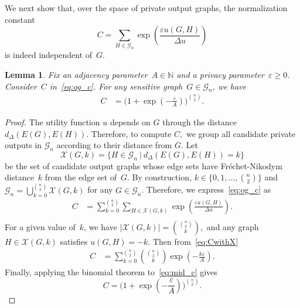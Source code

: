 \documentclass[conference]{ieeeconf}
\newtheorem{lemma}{Lemma}
\newcommand{\FN}{Fr\'echet-Nikodym }
\newcommand{\G}{\mathcal{G}}
\newcommand{\uti}{d_\Delta}
\begin{document}
We next show that, over the space of private output graphs,
the normalization constant 
\begin{equation}\label{eq:og_c}
C=\sum_{H\in\mathcal{G}_n}\exp\left(\frac{\varepsilon u(G,H)}{\Delta u}\right)
\end{equation}
is indeed
independent of~$G$.

\begin{lemma}\label{lem:norm_const}
Fix an adjacency parameter~$A \in \mathbb{N}$
and a privacy parameter~$\varepsilon \geq 0$.
Consider~$C$ in~\eqref{eq:og_c}. 
For any sensitive graph~$G\in\mathcal{G}_n$, we have 
\begin{equation}
\begin{aligned}\label{eq:big_C}
    C &= \biggl(1+\exp\left(-\frac{\varepsilon}{A}\right) \biggr)^{\binom{n}{2}}.
\end{aligned}
\end{equation}
\end{lemma}
\begin{proof}
    The utility function $u$ depends on $G$ through the distance~$\uti(E(G), E(H))$. 
Therefore, to compute $C,$ we group all candidate private outputs in $\mathcal{G}_n$ according to their distance from $G$.
Let
\begin{equation} \label{eq:X}
\mathcal{X}(G,k)=\{H\in \G_n \ | \ \uti(E(G),E(H))=k \}
\end{equation}
be the set of candidate output graphs whose edge sets have 
\FN distance~$k$ from the edge set of~$G$.
By construction, $k\in \{0, 1, \dots, \binom{n}{2}\}$ and~$\G_n = \bigcup_{k=0}^{\binom{n}{2}}\mathcal{X}(G,k)$ for any $G\in\mathcal{G}_n$. Therefore, we express~\eqref{eq:og_c} as
\begin{equation} \label{eq:CwithX}
\begin{aligned}
    C &= \sum_{k=0}^{\binom{n}{2}} \sum_{H\in \mathcal{X}(G,k)} \exp\left(\frac{\varepsilon u(G,H)}{\Delta u}\right). \\ 
\end{aligned}
\end{equation}
For a given value of~$k$, we have $|\mathcal{X}(G,k)|=\binom{\binom{n}{2}}{k},$ and any graph $H\in\mathcal{X}(G,k)$ satisfies $u(G,H)=-k$. 
Then from~\eqref{eq:CwithX} 
\begin{equation}
\begin{aligned}
    C &= \sum_{k=0}^{\binom{n}{2}} {\binom{\binom{n}{2}}{k}} \exp\left(-\frac{k\varepsilon}{A}\right).\label{eq:mid_c}
\end{aligned}
\end{equation}
Finally, applying the binomial theorem to~\eqref{eq:mid_c} gives $$
    C = \biggl(1+\exp\left(-\frac{\varepsilon}{A}\right) 
    \biggr)^{\binom{n}{2}}.$$ 
\end{proof}
\end{document}
